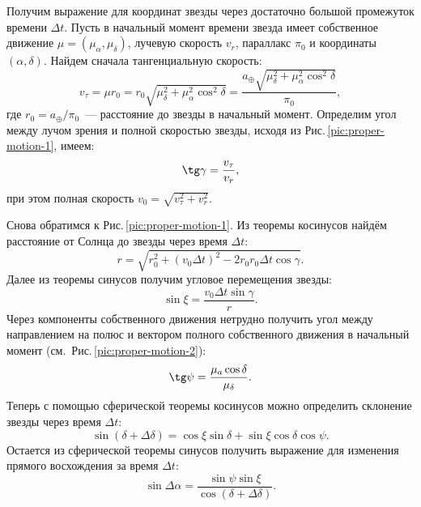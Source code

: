 Получим выражение для координат звезды через достаточно большой промежуток времени $\Delta t$. Пусть в начальный момент времени звезда имеет собственное движение $\mu = (\mu_\alpha, \mu_\delta)$, лучевую скорость $v_r$, параллакс $\pi_0$ и координаты $(\alpha, \delta)$. Найдем сначала тангенциальную скорость:
\begin{equation*}
    v_\tau =  \mu r_0 = r_0 \sqrt{ \mu_\delta^2 + \mu_\alpha^2 \cos^2 \delta} = \frac{a_\oplus \sqrt{ \mu_\delta^2 + \mu_\alpha^2 \cos^2 \delta}}{\pi_0},
\end{equation*}
где $r_0 = a_\oplus / \pi_0$~--- расстояние до звезды в начальный момент.
Определим угол между лучом зрения и полной скоростью звезды, исходя из Рис.\,\ref{pic:proper-motion-1}, имеем:
\begin{equation*}
    \tg \gamma = \frac{v_\tau}{v_r},
\end{equation*}
при этом полная скорость $v_0 = \sqrt{v_\tau^2 + v_r^2}$.

Снова обратимся к Рис.\,\ref{pic:proper-motion-1}. Из теоремы косинусов найдём расстояние от Солнца до звезды через время $\Delta t$:
\begin{equation*}
    r = \sqrt{r_0^2 + (v_0 \Delta t)^2 - 2 r_0 r_0 \Delta t \cos \gamma}.
\end{equation*}
Далее из теоремы синусов получим угловое перемещения звезды:
\begin{equation*}
    \sin \xi = \frac{v_0 \Delta t \sin \gamma}{r}.
\end{equation*}
Через компоненты собственного движения нетрудно получить угол между направлением на полюс и вектором полного собственного движения в начальный момент (см.~Рис.\,\ref{pic:proper-motion-2}):
\begin{equation*}
    \tg \psi =  \frac{\mu_a \cos \delta}{\mu_\delta}.
\end{equation*}
Теперь с помощью сферической теоремы косинусов можно определить склонение звезды через время $\Delta t$:
\begin{equation*}
    \sin (\delta + \Delta \delta) = \cos \xi \sin \delta + \sin \xi \cos \delta \cos \psi.
\end{equation*}
Остается из сферической теоремы синусов получить выражение для изменения прямого восхождения за время $\Delta t$:
\begin{equation*}
    \sin \Delta \alpha = \frac{\sin \psi \sin \xi}{\cos (\delta + \Delta \delta)}.
\end{equation*}



